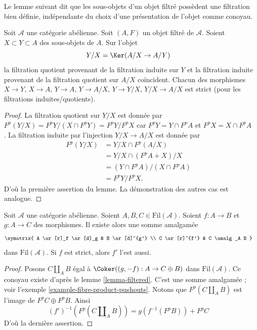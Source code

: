 \noindent
Le lemme suivant dit que les sous-objets d'un objet filtré possèdent une filtration
bien définie, indépendante du choix d'une présentation de l'objet comme
conoyau.

\begin{lemma}
\label{lemma-filtration-subobject}
Soit $\mathcal{A}$ une catégorie abélienne.
Soit $(A, F)$ un objet filtré de $\mathcal{A}$.
Soient $X \subset Y \subset A$ des sous-objets de $A$.
Sur l'objet
$$
Y/X = \Ker(A/X \to A/Y)
$$
la filtration quotient provenant de la filtration induite sur $Y$ et la
filtration induite provenant de la filtration quotient sur $A/X$ coïncident.
Chacun des morphismes $X \to Y$, $X \to A$, $Y \to A$, $Y \to A/X$,
$Y \to Y/X$, $Y/X \to A/X$ est strict (pour les filtrations induites/quotients).
\end{lemma}

\begin{proof}
La filtration quotient sur $Y/X$ est donnée par
$F^p(Y/X) = F^pY/(X \cap F^pY) = F^pY/F^pX$
car $F^pY = Y \cap F^pA$ et $F^pX = X \cap F^pA$.
La filtration induite par l'injection $Y/X \to A/X$ est donnée par
\begin{align*}
F^p(Y/X) & = Y/X \cap F^p(A/X) \\
& = Y/X \cap (F^pA + X)/X \\
& = (Y \cap F^pA)/(X \cap F^pA) \\
& = F^pY/F^pX.
\end{align*}
D'où la première assertion du lemme.
La démonstration des autres cas est analogue.
\end{proof}

\begin{lemma}
\label{lemma-pushout-filtered}
Soit $\mathcal{A}$ une catégorie abélienne.
Soient $A, B, C \in \text{Fil}(\mathcal{A})$.
Soient $f : A \to B$ et $g : A \to C$ des morphismes.
Il existe alors une somme amalgamée
$$
\xymatrix{
A \ar[r]_f \ar[d]_g & B \ar[d]^{g'} \\
C \ar[r]^{f'} & C \amalg_A B
}
$$
dans $\text{Fil}(\mathcal{A})$. Si $f$ est strict, alors $f'$ l'est aussi.
\end{lemma}

\begin{proof}
Posons $C \amalg_A B$ égal à $\Coker((g, -f) : A \to C \oplus B)$
dans $\text{Fil}(\mathcal{A})$. Ce conoyau existe d'après le
lemme \ref{lemma-filtered}.
C'est une somme amalgamée ; voir
l'exemple \ref{example-fibre-product-pushouts}.
Notons que $F^p(C \amalg_A B)$ est l'image de $F^pC \oplus F^pB$.
Ainsi
$$
(f')^{-1}(F^p(C \amalg_A B)) = g(f^{-1}(F^pB)) + F^pC
$$
D'où la dernière assertion.
\end{proof}

